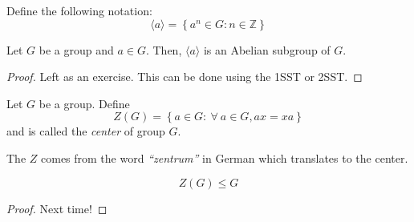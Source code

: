 \begin{remark}
\end{remark}

\begin{theorem}
    Define the following notation:
    \[
        \langle a \rangle = \left\{a^n \in G : n \in \mathbb{Z}\right\}
    \]

    Let \(G\) be a group and \(a \in G\). Then, \(\langle a \rangle\) is an Abelian subgroup of \(G\).
\end{theorem}

\begin{proof}
    Left as an exercise. This can be done using the 1SST or 2SST.
\end{proof}

\begin{definition}
    Let \(G\) be a group. Define
    \[
        Z(G) = \left\{a \in G : \ \forall \ a \in G, ax = xa\right\}
    \]
    and is called the \textit{center} of group \(G\).
\end{definition}

\begin{distraction}
    The \(Z\) comes from the word \textit{``zentrum''} in German which translates to the center.
\end{distraction}

\begin{theorem}
    \[
        Z(G) \leq G
    \]
\end{theorem}

\begin{proof}
    Next time!
\end{proof}
